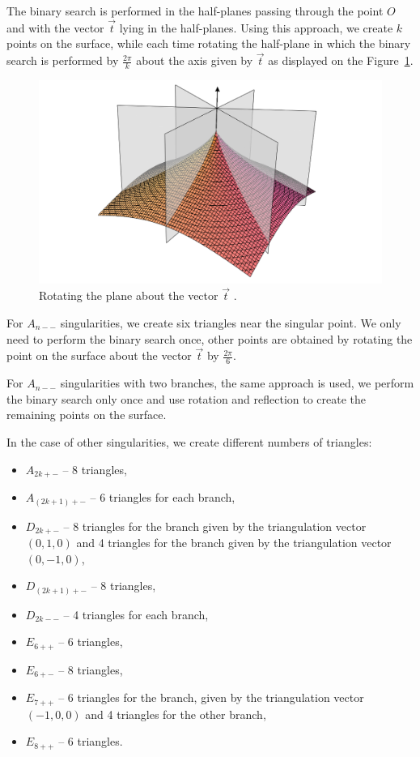 The binary search is performed in the half-planes passing through the point
$O$ and with the vector $\vec{t}$ lying in the half-planes.
Using this approach, we create $k$ points on the surface, while each time
rotating the half-plane in which the binary search is performed by $\frac{2\pi}{k}$
about the axis given by $\vec{t}$ as displayed on the Figure~\ref{img:rotating-planes}.

\begin{figure}
    \centerline{\includegraphics[scale=0.3]{images/rotating-planes}}
    \caption[Rotating the plane about the vector]
    {Rotating the plane about the vector $\vec{t}$ \cite{calcplot3d}.}
    \label{img:rotating-planes}
\end{figure}

For $A_{n--}$ singularities, we create six
triangles near the singular point. We only need to perform the binary search once,
other points are obtained by rotating the point on the surface about the vector 
$\vec{t}$ by $\frac{2 \pi}{6}$.

For $A_{n--}$ singularities with two branches, the same approach is used,
we perform the binary search only once and use rotation and
reflection to create the remaining points on the surface.

In the case of other singularities, we create different numbers of triangles:
\begin{itemize}
    \item $A_{2k+-}$ -- 8 triangles,
    \item $A_{(2k+1)+-}$ -- 6 triangles for each branch,
    \item $D_{2k+-}$ -- 8 triangles for the branch given by the 
    triangulation vector $(0,1,0)$ and 4 triangles for the branch
    given by the triangulation vector $(0,-1,0)$,
    \item $D_{(2k+1)+-}$ -- 8 triangles,
    \item $D_{2k--}$ -- 4 triangles for each branch,
    \item $E_{6++}$ -- 6 triangles,
    \item $E_{6+-}$ -- 8 triangles,
    \item $E_{7++}$ -- 6 triangles for the branch, given by the
    triangulation vector $(-1, 0, 0)$ and 4 triangles for the other
    branch,
    \item $E_{8++}$ -- 6 triangles.
\end{itemize}

